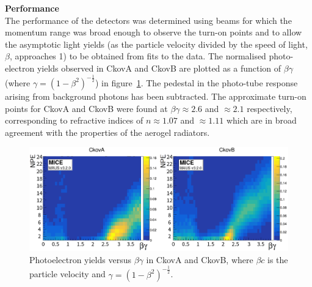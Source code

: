 \noindent\textbf{Performance} \\
\noindent
The performance of the detectors was determined using beams for which
the momentum range was broad enough to observe the turn-on points and to
allow the asymptotic light yields (as the particle velocity divided by the speed of light, $\beta$, approaches 1) to be
obtained from fits to the data.
The normalised photo-electron yields observed in CkovA and CkovB are
plotted as a function of $\beta\gamma$ (where $\gamma=(1-\beta^2)^{-\frac{1}{2}}$) in
figure~\ref{fig:ckov_betagamma}.
The pedestal in the photo-tube response arising from background
photons has been subtracted.
The approximate turn-on points for CkovA and CkovB were found at
$\beta\gamma \approx 2.6$ and $\approx 2.1$ respectively,
corresponding to refractive indices of $n \approx 1.07$ and $\approx 1.11$ which are in broad agreement with the
properties of the aerogel radiators. 
\begin{figure}[htb]
  \begin{center}
    \includegraphics[width=0.99\columnwidth]{./03-Ckov/Figures/scatter_betagamma_logo_2.png}
    \caption{Photoelectron yields versus $\beta\gamma$ in CkovA and CkovB,
    where $\beta c$ is the particle velocity and $\gamma=(1-\beta^2)^{-\frac{1}{2}}$.
    }
    \label{fig:ckov_betagamma}
  \end{center}
\end{figure}
